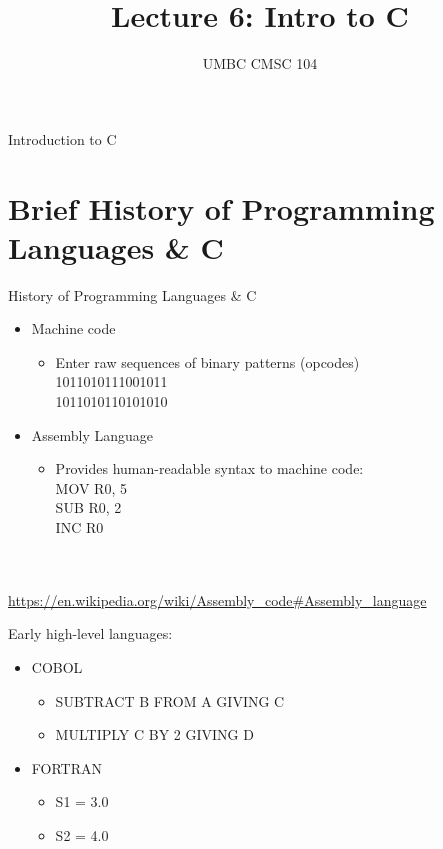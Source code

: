 \documentclass[graphics]{beamer}
\title{Lecture 6: Intro to C}
\author{UMBC CMSC 104}
\date{}
\begin{document}
\begin{frame}{}
\centering
    Introduction to C
\end{frame}

\frame{\tableofcontents}

\section{Brief History of Programming Languages \& C}
\begin{frame}{History of Programming Languages \& C}
     {
        \begin{itemize}
            \item Machine code
            \begin{itemize}
                \item Enter raw sequences of binary patterns (opcodes) \\
                1011010111001011 \\
                1011010110101010
            \end{itemize}
            \item Assembly Language
            \begin{itemize}
                \item Provides human-readable syntax to machine code: \\
                MOV R0, 5 \\
                SUB R0, 2 \\
                INC R0
            \end{itemize}
        \end{itemize}
        \\ ~~ \\
        \footnotesize{\url{https://en.wikipedia.org/wiki/Assembly_code\#Assembly_language}}
    }
     {
        Early high-level languages:
        \begin{itemize}
            \item COBOL
            \begin{itemize}
                \item SUBTRACT B FROM A GIVING C
                \item MULTIPLY C BY 2 GIVING D
            \end{itemize}
            \item FORTRAN
            \begin{itemize}
                \item S1 = 3.0
                \item S2 = 4.0

\end{itemize}
\end{itemize}}
\end{frame}
\end{document}
